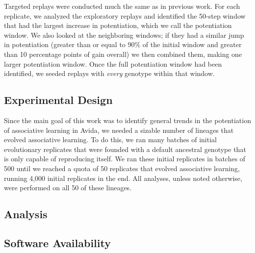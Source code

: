 Targeted replays were conducted much the same as in previous work. 
For each replicate, we analyzed the exploratory replays and identified the 50-step window that had the largest increase in potentiation, which we call the potentiation window. 
We also looked at the neighboring windows; if they had a similar jump in potentiation (greater than or equal to 90\% of the initial window and greater than 10 percentage points of gain overall) we then combined them, making one larger potentiation window. 
Once the full potentiation window had been identified, we seeded replays with \textit{every} genotype within that window. 



\subsection{Experimental Design}
\label{sub:experiment-design}
Since the main goal of this work was to identify general trends in the potentiation of associative learning in Avida, we needed a sizable number of lineages that evolved associative learning. 
To do this, we ran many batches of initial evolutionary replicates that were founded with a default ancestral genotype that is only capable of reproducing itself. 
We ran these initial replicates in batches of 500 until we reached a quota of 50 replicates that evolved associative learning, running 4,000 initial replicates in the end.
All analyses, unless noted otherwise, were performed on all 50 of these lineages. 

\subsection{Analysis}
\label{sub:analysis}

\subsection{Software Availability}
\label{sub:software}